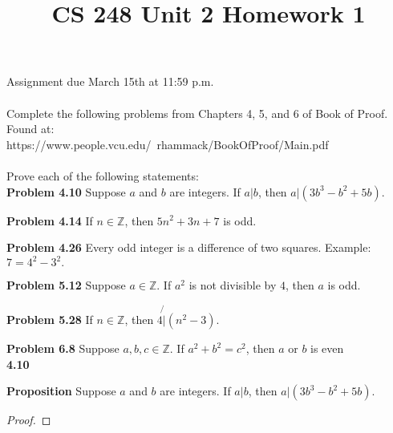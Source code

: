 \documentclass[12pt]{article}
\title{CS 248 Unit 2 Homework 1}
\def\Z{\mathbb Z}
\begin{document}
Assignment due March 15th at 11:59 p.m. \\ \\
Complete the following problems from Chapters 4, 5, and 6 of Book of Proof. Found at: \\ https://www.people.vcu.edu/~rhammack/BookOfProof/Main.pdf \\ \\
Prove each of the following statements: \\ 

{\bf Problem 4.10} Suppose $a$ and $b$ are integers. If $a|b$, then $a|(3b^3-b^2+5b).$

{\bf Problem 4.14} If $n \in \Z$, then $5n^2+3n+7$ is odd.

{\bf Problem 4.26} Every odd integer is a difference of two squares. Example: $7 = 4^2-3^2.$

{\bf Problem 5.12} Suppose $a \in \Z$. If $a^2$ is not divisible by $4$, then $a$ is odd.

{\bf Problem 5.28} If $n \in \Z$, then $4 \not{|}  (n^2-3).$ 

{\bf Problem 6.8} Suppose $a,b,c \in \Z$. If $a^2+b^2=c^2$, then $a$ or $b$ is even \\

{\bf 4.10}

{\bf Proposition} Suppose $a$ and $b$ are integers. If $a|b$, then $a|(3b^3-b^2+5b).$
\begin{proof}
    
\end{proof}
\end{document}
